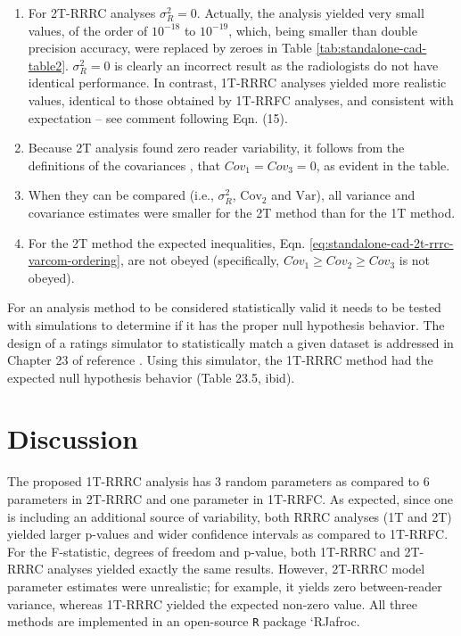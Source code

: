 \documentclass[
]{book}
\providecommand{\tightlist}{%
  \setlength{\itemsep}{0pt}\setlength{\parskip}{0pt}}
\begin{document}
\begin{enumerate}
\def\labelenumi{\arabic{enumi}.}
\tightlist
\item
  For 2T-RRRC analyses \(\sigma_R^2 = 0\). Actually, the analysis yielded very small values, of the order of \(10^{-18}\) to \(10^{-19}\), which, being smaller than double precision accuracy, were replaced by zeroes in Table \ref{tab:standalone-cad-table2}. \(\sigma_R^2 = 0\) is clearly an incorrect result as the radiologists do not have identical performance. In contrast, 1T-RRRC analyses yielded more realistic values, identical to those obtained by 1T-RRFC analyses, and consistent with expectation -- see comment following Eqn. (15).
\item
  Because 2T analysis found zero reader variability, it follows from the definitions of the covariances \citep{obuchowski1995hypothesis}, that \(Cov_1 = Cov_3 = 0\), as evident in the table.
\item
  When they can be compared (i.e., \(\sigma_R^2\), \(\text{Cov}_2\) and \(\text{Var}\)), all variance and covariance estimates were smaller for the 2T method than for the 1T method.
\item
  For the 2T method the expected inequalities, Eqn. \eqref{eq:standalone-cad-2t-rrrc-varcom-ordering}, are not obeyed (specifically, \(Cov_1 \geq Cov_2 \geq Cov_3\) is not obeyed).
\end{enumerate}

For an analysis method to be considered statistically valid it needs to be tested with simulations to determine if it has the proper null hypothesis behavior. The design of a ratings simulator to statistically match a given dataset is addressed in Chapter 23 of reference \citep{chakraborty2017observer}. Using this simulator, the 1T-RRRC method had the expected null hypothesis behavior (Table 23.5, ibid).

\hypertarget{standalone-cad-radiologists-discussion}{%
\section{Discussion}\label{standalone-cad-radiologists-discussion}}

The proposed 1T-RRRC analysis has 3 random parameters as compared to 6 parameters in 2T-RRRC and one parameter in 1T-RRFC. As expected, since one is including an additional source of variability, both RRRC analyses (1T and 2T) yielded larger p-values and wider confidence intervals as compared to 1T-RRFC. For the F-statistic, degrees of freedom and p-value, both 1T-RRRC and 2T-RRRC analyses yielded exactly the same results. However, 2T-RRRC model parameter estimates were unrealistic; for example, it yields zero between-reader variance, whereas 1T-RRRC yielded the expected non-zero value. All three methods are implemented in an open-source \texttt{R} package `RJafroc.
\end{document}
